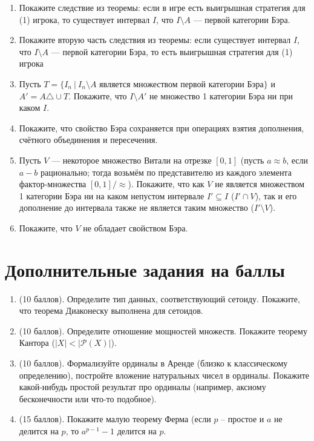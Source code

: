 \documentclass[10pt,a4paper,oneside]{article}
\begin{document}
\begin{enumerate}
\begin{enumerate}
Покажите, что множество $R(p)$ точек, отвергаемых частичным протоколом $p$ --- всюду неплотное.
\emph{Указание:} речь не идёт о составлении отдельной стратегии, отвергающей точку $a$. Речь идёт о исследовании поведения
некоторой уже данной (в условии теоремы) стратегии.
\item Покажите следствие из теоремы: если в игре есть выигрышная стратегия для (1) игрока, то существует интервал $I$,
что $I \setminus A$ --- первой категории Бэра.
\item Покажите вторую часть следствия из теоремы: если существует интервал $I$, что $I \setminus A$ --- первой категории Бэра,
то есть выигрышная стратегия для (1) игрока
\item Пусть $T = \{I_n \ |\ I_n \setminus A \text{ является множеством первой категории Бэра}\}$ и $A' = A \triangle \cup T$. Покажите, что 
$I \setminus A'$ не множество 1 категории Бэра ни при каком $I$.
\item Покажите, что свойство Бэра сохраняется при операциях взятия дополнения, счётного объединения и пересечения.
\item Пусть $V$ --- некоторое множество Витали на отрезке $[0,1]$ (пусть $a\approx b$, если $a-b$ рационально;
тогда возьмём по представителю из каждого элемента фактор-множества $[0,1]/\approx$). Покажите, что как $V$ не является
множеством 1 категории Бэра ни на каком непустом интервале $I' \subseteq I$ ($I' \cap V$), так и его дополнение до 
интервала также не является таким множество ($I' \setminus V$).
\item Покажите, что $V$ не обладает свойством Бэра.
\end{enumerate}
\end{enumerate}

\section*{Дополнительные задания на баллы}

\begin{enumerate}
\item (10 баллов). Определите тип данных, соответствующий сетоиду. Покажите, что теорема Диаконеску выполнена для сетоидов.
\item (10 баллов). Определите отношение мощностей множеств. Покажите теорему Кантора ($|X| < |\mathcal{P}(X)|$). 
\item (10 баллов). Формализуйте ординалы в Аренде (близко к классическому определению), постройте вложение натуральных чисел в ординалы.
Покажите какой-нибудь простой результат про ординалы (например, аксиому бесконечности или что-то подобное).
\item (15 баллов). Покажите малую теорему Ферма (если $p$ -- простое и $a$ не делится на $p$, то $a^{p-1}-1$ делится на $p$.
\end{enumerate}
\end{document}
